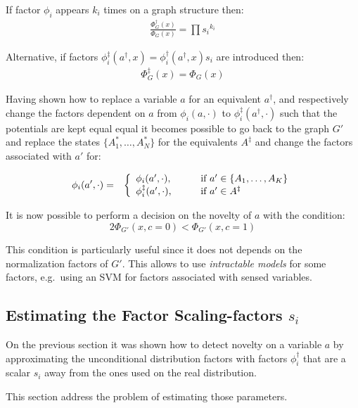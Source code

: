 If factor $\phi_i$ appears $k_i$ times on a graph structure then:
\begin{eqnarray}
\frac{\Phi^\dag_G(x)}{\Phi_G(x)} =  \prod {s_i}^{k_i}
\end{eqnarray}

Alternative, if factors $\phi^\ddag_i(a^\dag,x) = \phi^\dag_i(a^\dag,x) s_i$ are
introduced then:
\begin{eqnarray}
\Phi^\ddag_G(x) = \Phi_G(x)
\end{eqnarray}

Having shown how to replace a variable $a$ for an equivalent $a^\dag$, and
respectively change the factors dependent on $a$ from $\phi_i(a,\cdot)$ to
$\phi^\ddag_i(a^\dag,\cdot)$ such that the potentials are kept equal equal
it becomes possible to go back to the graph $G'$ and
replace the states $\{A^*_1,\dotsc,A^*_N\}$ for the equivalents $A^\ddag$
and change the factors associated with $a'$ for:

\begin{eqnarray*}
\phi_i(a', \cdot) &=& \left\{
  \begin{array}{l l}
    \phi_i(a',\cdot), & \qquad \text{if } a' \in \{A_1,\dotsc,A_K\} \\
    \phi^\ddag_i(a', \cdot), & \qquad \text{if } a' \in A^\ddag
  \end{array} \right. \\
\end{eqnarray*}

It is now possible to perform a decision on the novelty of $a$ with the condition:
\begin{equation}
2 \Phi_{G'}(x, c = 0) < \Phi_{G'}(x, c= 1)
\end{equation}

This condition is particularly useful since it does not depends on the normalization
factors of $G'$. This allows to use \emph{intractable models} for some factors,
e.g.\ using an \gls{SVM} for factors associated with sensed variables. 


\subsection{Estimating the Factor Scaling-factors $s_i$}
On the previous section it was shown how to detect novelty on a variable $a$ by
approximating the unconditional distribution factors with factors $\phi^\dag_i$
that are a scalar $s_i$ away from the ones used on the real distribution.

This section address the problem of estimating those parameters.




